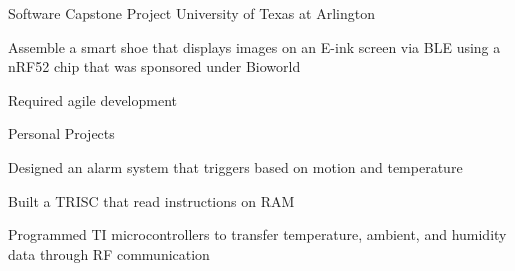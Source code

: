 


\begin{cventries}


\cventry
{} %
{Software Capstone Project } %
{University of Texas at Arlington} %
{} %
{ %
\begin{cvitems}
\item {Assemble a smart shoe that displays images on an E-ink screen via BLE using a nRF52 chip that was sponsored under Bioworld}
\item {Required agile development}
\end{cvitems}
}

\cventry
{} %
{Personal Projects} %
{} %
{} %
{ %
\begin{cvitems}
	\item {Designed an alarm system that triggers based on motion and temperature}
	\item {Built a TRISC that read instructions on RAM}
	\item { Programmed TI microcontrollers to transfer temperature, ambient, and humidity data through RF communication }
\end{cvitems}
}

\end{cventries}